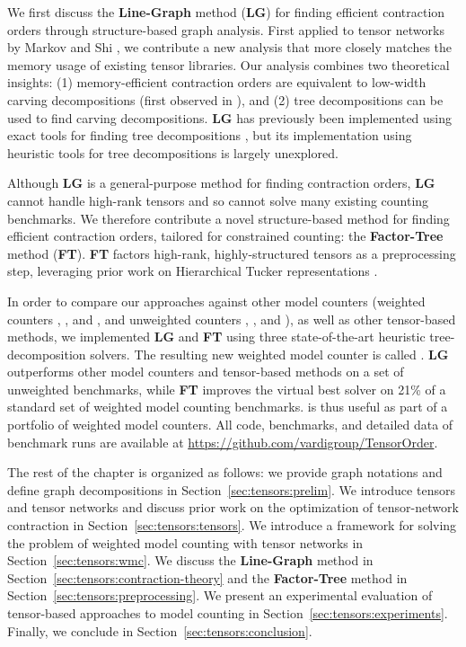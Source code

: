 We first discuss the \textbf{Line-Graph} method (\textbf{LG}) for finding efficient contraction orders through structure-based graph analysis. First applied to tensor networks by Markov and Shi \cite{MS08}, we contribute a new analysis that more closely matches the memory usage of existing tensor libraries. Our analysis combines two theoretical insights: (1) memory-efficient contraction orders are equivalent to low-width carving decompositions (first observed in \cite{de15}), and (2) tree decompositions can be used to find carving decompositions. \textbf{LG} has previously been implemented using exact tools for finding tree decompositions \cite{DFGHSW18}, but its implementation using heuristic tools for tree decompositions is largely unexplored.

Although \textbf{LG} is a general-purpose method for finding contraction orders, \textbf{LG} cannot handle high-rank tensors and so cannot solve many existing counting benchmarks. We therefore contribute a novel structure-based method for finding efficient contraction orders, tailored for constrained counting: the \textbf{Factor-Tree} method (\textbf{FT}). \textbf{FT} factors high-rank, highly-structured tensors as a preprocessing step, leveraging prior work on Hierarchical Tucker representations \cite{Grasedyck10}.

In order to compare our approaches against other model counters (weighted counters  \cite{SBK05},  \cite{OD15}, and  \cite{LM17}, and unweighted counters  \cite{CW16},  \cite{FHMW17}, and  \cite{Thurley2006}), as well as other tensor-based methods, we implemented \textbf{LG} and \textbf{FT} using three state-of-the-art heuristic tree-decomposition solvers. The resulting new weighted model counter is called . \textbf{LG} outperforms other model counters and tensor-based methods on a set of unweighted benchmarks, while \textbf{FT} improves the virtual best solver on 21\% of a standard set of weighted model counting benchmarks.  is thus useful as part of a portfolio of weighted model counters. All code, benchmarks, and detailed data of benchmark runs are available at \url{https://github.com/vardigroup/TensorOrder}.


The rest of the chapter is organized as follows: we provide graph notations and define graph decompositions in Section~\ref{sec:tensors:prelim}. We introduce tensors and tensor networks and discuss prior work on the optimization of tensor-network contraction in Section~\ref{sec:tensors:tensors}. We introduce a framework for solving the problem of weighted model counting with tensor networks in Section~\ref{sec:tensors:wmc}. We discuss the \textbf{Line-Graph} method in Section~\ref{sec:tensors:contraction-theory} and the \textbf{Factor-Tree} method in Section~\ref{sec:tensors:preprocessing}. We present an experimental evaluation of tensor-based approaches to model counting in Section~\ref{sec:tensors:experiments}. Finally, we conclude in Section~\ref{sec:tensors:conclusion}.
